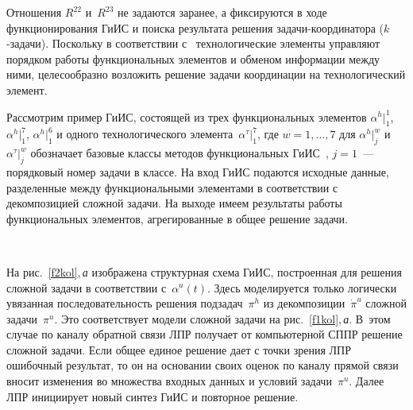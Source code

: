 \begin{multicols}{2}
  Отношения $R^{22}$ и~$R^{23}$ не задаются заранее, а фиксируются в ходе 
функционирования ГиИС и поиска результата решения 
  за\-да\-чи-ко\-ор\-ди\-на\-то\-ра ($k$-за\-да\-чи). Поскольку в соответствии 
с~\cite{8kol} технологические элементы управляют порядком работы 
функциональных элементов и обменом информации между ними, 
целесообразно возложить решение задачи координации на технологический 
элемент.
  
  Рассмотрим пример ГиИС, состоящей из трех функциональных элементов 
$\alpha^h\vert_1^1$, $\alpha^h\vert_1^7$, $\alpha^h\vert_1^6$ и одного 
технологического элемента~$\alpha^\tau\vert_1^7$, где $w=1, \ldots , 7$ для 
$\alpha^h\vert_j^w$ и $\alpha^\tau\vert_j^w$ обозначает базовые классы методов 
функциональных ГиИС~\cite{8kol}, $j=1$~--- порядковый номер задачи в 
классе. На вход ГиИС подаются исходные данные, разделенные между 
функциональными элементами в соответствии с декомпозицией сложной 
задачи. На выходе имеем результаты работы функциональных элементов, 
агрегированные в общее решение задачи.

\begin{figure*} %
\vspace*{1pt}
\begin{center}
\mbox{%
\epsfxsize=165.684mm
}
\end{center}
\vspace*{-3pt}
\vspace*{9pt}
\end{figure*}
  
  На рис.~\ref{f2kol},\,\textit{а} изображена структурная схема \mbox{ГиИС}, 
построенная для решения сложной задачи в соответствии с~$\alpha^u(t)$. Здесь 
моделируется только логически увязанная последовательность решения 
подзадач~$\pi^h$ из декомпозиции~$\dot{\pi}^u$ сложной задачи~$\pi^u$. Это 
соответствует модели сложной задачи на рис.~\ref{f1kol},\,\textit{а}. В~этом 
случае по каналу обратной связи ЛПР получает от компьютерной СППР 
решение сложной задачи. Если общее единое решение дает с точки зрения ЛПР 
ошибочный результат, то он на основании своих оценок по каналу прямой 
связи вносит изменения во множества входных данных и условий 
задачи~$\pi^u$. Далее ЛПР инициирует новый синтез ГиИС и повторное 
решение.
  

\end{multicols}
